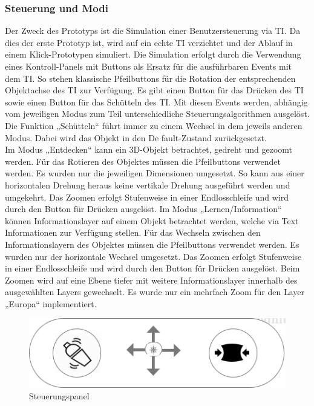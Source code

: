\documentclass[runningheads,a4paper, 12pt]{llncs}
\begin{document}
\subsubsection{Steuerung und Modi}
Der Zweck des Prototyps ist die Simulation einer Benutzersteuerung via TI. Da dies der erste Prototyp ist, wird auf ein echte TI verzichtet und der Ablauf in einem Klick-Prototypen simuliert. Die Simulation erfolgt durch die Verwendung eines Kontroll-Panels mit Buttons als Ersatz für die ausführbaren Events mit dem TI. So stehen klassische Pfeilbuttons für die Rotation der entsprechenden Objektachse des TI zur Verfügung. Es gibt einen Button für das Drücken des TI sowie einen Button für das Schütteln des TI.
Mit diesen Events werden, abhängig vom jeweiligen Modus zum Teil unterschiedliche Steuerungsalgorithmen ausgelöst.
Die Funktion „Schütteln“ führt immer zu einem Wechsel in dem jeweils anderen Modus. Dabei wird das Objekt in den De fault-Zustand zurückgesetzt.
\\
Im Modus „Entdecken“ kann ein 3D-Objekt betrachtet, gedreht und gezoomt werden. Für das Rotieren des Objektes müssen die Pfeilbuttons verwendet werden. Es wurden nur die jeweiligen Dimensionen umgesetzt. So kann aus einer horizontalen Drehung heraus keine vertikale Drehung ausgeführt werden und umgekehrt. Das Zoomen erfolgt Stufenweise in einer Endlosschleife und wird durch den Button für Drücken ausgelöst.
Im Modus „Lernen/Information“ können Informationslayer auf einem Objekt betrachtet werden, welche via Text Informationen zur Verfügung stellen. Für das Wechseln zwischen den Informationslayern des Objektes müssen die Pfeilbuttons verwendet werden. Es wurden nur der horizontale Wechsel umgesetzt.
Das Zoomen erfolgt Stufenweise in einer Endlosschleife und wird durch den Button für Drücken ausgelöst. Beim Zoomen wird auf eine Ebene tiefer mit weitere Informationslayer innerhalb des ausgewählten Layers gewechselt.
Es wurde nur ein mehrfach Zoom für den Layer „Europa“ implementiert.

\begin{figure}[H]
	\centering
	\includegraphics[angle=0,scale=3.0]{controll_panel}
	\caption{Steuerungspanel}
	\label{fig:result7}
\end{figure}
\end{document}
